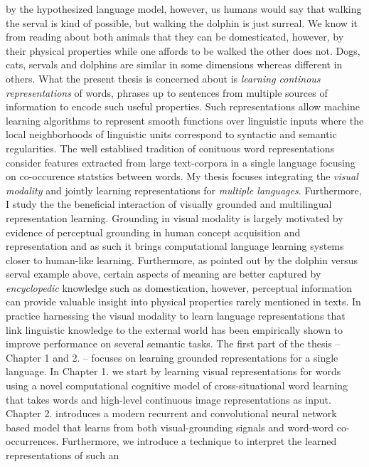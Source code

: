 by the hypothesized language model, however, us humans would say that walking the serval is
kind of possible, but walking the dolphin is just surreal. We know it from reading about both animals
that they can be domesticated, however, by their physical properties while one affords to be walked
the other does not. Dogs, cats, servals and dolphins are similar in some dimensions whereas
different in others.
What the present thesis is concerned about is \emph{learning continous representations}
of words, phrases up to sentences from multiple sources of information to encode such useful properties.
Such representations allow machine learning algorithms to represent smooth functions over linguistic
inputs where the local neighborhoods of linguistic units correspond to syntactic and semantic regularities.
The well establised tradition of conituous word representations consider features extracted
from large text-corpora in a single language focusing on co-occurence statstics between words.
My thesis focuses integrating the \emph{visual modality} and jointly learning representations for
\emph{multiple languages}. Furthermore, I study the the beneficial interaction of
visually grounded and multilingual representation learning.
Grounding in visual modality is largely motivated by evidence of
perceptual grounding in human concept acquisition and representation \cite{barsalou2003grounding} and as such
it brings computational language learning systems closer to human-like learning.
Furthermore, as pointed out by the dolphin versus serval example above,
certain aspects of meaning are better captured by \emph{encyclopedic}
knowledge such as domestication, however, perceptual information can provide valuable insight into
physical properties rarely mentioned in texts. In practice harnessing the visual modality to learn language
representations that link linguistic knowledge
to the external world \cite{kiela2014improving,baroni2016grounding,elliott2017imagination,kiela2017learning,yoo2017improving}
has been empirically shown to improve performance on several semantic tasks.
The first part of the thesis -- Chapter 1 and 2. -- focuses on learning grounded representations for a single language.
In Chapter 1. we start by learning visual representations for words using a novel computational
cognitive model of cross-situational word learning that takes words and high-level continuous image
representations as input. Chapter 2. introduces a modern recurrent and convolutional neural network based
model that learns from both visual-grounding signals and word-word co-occurrences.
Furthermore, we introduce a technique to interpret the learned representations of such an
